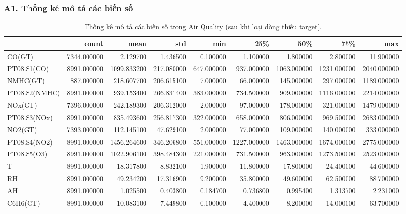 \documentclass[a4paper]{article}
\begin{document}
\subsubsection*{A1. Thống kê mô tả các biến số}
\begin{table}[H]
    \centering
    \scriptsize
    \begin{tabular}{lrrrrrrrr}
    \toprule
     & count & mean & std & min & 25\% & 50\% & 75\% & max \\
    \midrule
    CO(GT) & 7344.000000 & 2.129700 & 1.436500 & 0.100000 & 1.100000 & 1.800000 & 2.800000 & 11.900000 \\
    PT08.S1(CO) & 8991.000000 & 1099.833200 & 217.080000 & 647.000000 & 937.000000 & 1063.000000 & 1231.000000 & 2040.000000 \\
    NMHC(GT) & 887.000000 & 218.607700 & 206.615100 & 7.000000 & 66.000000 & 145.000000 & 297.000000 & 1189.000000 \\
    PT08.S2(NMHC) & 8991.000000 & 939.153400 & 266.831400 & 383.000000 & 734.500000 & 909.000000 & 1116.000000 & 2214.000000 \\
    NOx(GT) & 7396.000000 & 242.189300 & 206.312000 & 2.000000 & 97.000000 & 178.000000 & 321.000000 & 1479.000000 \\
    PT08.S3(NOx) & 8991.000000 & 835.493600 & 256.817300 & 322.000000 & 658.000000 & 806.000000 & 969.500000 & 2683.000000 \\
    NO2(GT) & 7393.000000 & 112.145100 & 47.629100 & 2.000000 & 77.000000 & 109.000000 & 140.000000 & 333.000000 \\
    PT08.S4(NO2) & 8991.000000 & 1456.264600 & 346.206800 & 551.000000 & 1227.000000 & 1463.000000 & 1674.000000 & 2775.000000 \\
    PT08.S5(O3) & 8991.000000 & 1022.906100 & 398.484300 & 221.000000 & 731.500000 & 963.000000 & 1273.500000 & 2523.000000 \\
    T & 8991.000000 & 18.317800 & 8.832100 & -1.900000 & 11.800000 & 17.800000 & 24.400000 & 44.600000 \\
    RH & 8991.000000 & 49.234200 & 17.316900 & 9.200000 & 35.800000 & 49.600000 & 62.500000 & 88.700000 \\
    AH & 8991.000000 & 1.025500 & 0.403800 & 0.184700 & 0.736800 & 0.995400 & 1.313700 & 2.231000 \\
    C6H6(GT) & 8991.000000 & 10.083100 & 7.449800 & 0.100000 & 4.400000 & 8.200000 & 14.000000 & 63.700000 \\
    \bottomrule
    \end{tabular}
    \caption{Thống kê mô tả các biến số trong Air Quality (sau khi loại dòng thiếu target).}
\end{table}
\end{document}
